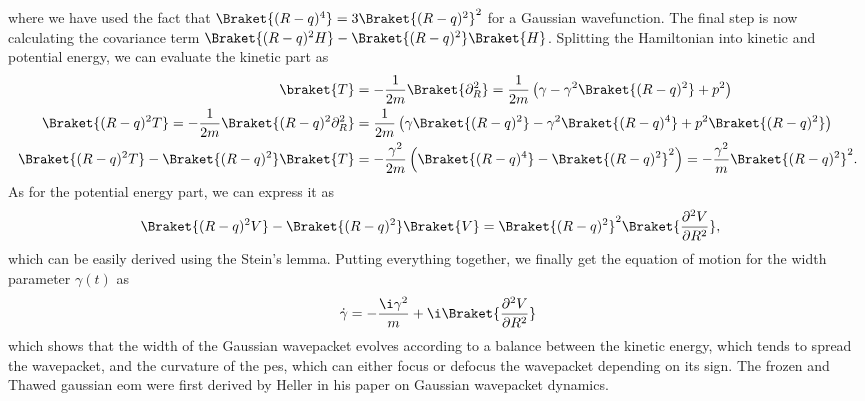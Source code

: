 where we have used the fact that $\Braket{(R-q)^4}=3\Braket{(R-q)^2}^2$ for a Gaussian wavefunction. The final step is now calculating the covariance term $\Braket{(R-q)^2H}-\Braket{(R-q)^2}\Braket{H}$. Splitting the Hamiltonian into kinetic and potential energy, we can evaluate the kinetic part as
\begin{align}
\braket{T}&=-\frac{1}{2m}\Braket{\partial_R^2}=\frac{1}{2m}\left(\gamma-\gamma^2\Braket{(R-q)^2}+p^2\right)\\
\Braket{(R-q)^2T}=-\frac{1}{2m}\Braket{(R-q)^2\partial_R^2}&=\frac{1}{2m}\left(\gamma\Braket{(R-q)^2}-\gamma^2\Braket{(R-q)^4}+p^2\Braket{(R-q)^2}\right)\\
\Braket{(R-q)^2T}-\Braket{(R-q)^2}\Braket{T}&=-\frac{\gamma^2}{2m}\left(\Braket{(R-q)^4}-\Braket{(R-q)^2}^2\right)=-\frac{\gamma^2}{m}\Braket{(R-q)^2}^2.
\end{align}
As for the potential energy part, we can express it as
\begin{align}
\Braket{(R-q)^2V}-\Braket{(R-q)^2}\Braket{V}&=\Braket{(R-q)^2}^2\Braket{\frac{\partial^2 V}{\partial R^2}},
\end{align}
which can be easily derived using the Stein's lemma. Putting everything together, we finally get the equation of motion for the width parameter $\gamma(t)$ as
\begin{equation}
\dot\gamma=-\frac{\i\gamma^2}{m}+\i\Braket{\frac{\partial^2 V}{\partial R^2}}
\end{equation}
which shows that the width of the Gaussian wavepacket evolves according to a balance between the kinetic energy, which tends to spread the wavepacket, and the curvature of the \acrshort{pes}, which can either focus or defocus the wavepacket depending on its sign. The frozen and Thawed gaussian \acrshort{eom} were first derived by Heller in his paper on Gaussian wavepacket dynamics.~\supercite{10.1063/1.430620}
